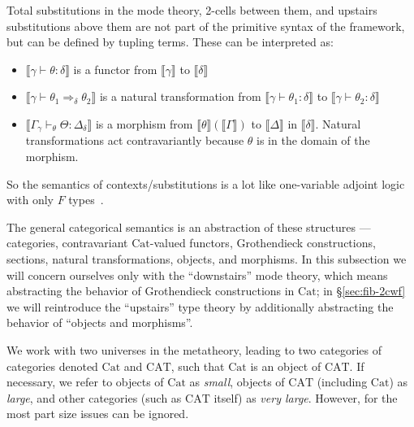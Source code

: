 \documentclass[10pt]{article}
\theoremstyle{definition}
\newcommand{\yields}{\vdash}
\newcommand{\tcell}{\Rightarrow}
\newcommand\mm[1]{\llbracket #1 \rrbracket}
\newcommand\Cat{\mathrm{Cat}}
\newcommand\CAT{\mathrm{CAT}}
\begin{document}
Total substitutions in the mode theory, 2-cells between them, and
upstairs substitutions above them are not part of the primitive syntax
of the framework, but can be defined by tupling terms.
These can be interpreted as: 
\begin{itemize}
\item $\mm{\gamma \yields \theta : \delta}$ is a functor from $\mm{\gamma}$ to $\mm{\delta}$
\item $\mm{\gamma \yields \theta_1 \tcell_\delta \theta_2}$ is a natural
  transformation from $\mm{\gamma \yields \theta_1 : \delta}$ to
  $\mm{\gamma \yields \theta_2 : \delta}$
\item $\mm{\Gamma_{\gamma} \yields_\theta \Theta : \Delta_\delta}$ is a
  morphism from $\mm{\theta}(\mm{\Gamma})$ to $\mm{\Delta}$ in
  $\mm{\delta}$.
  Natural transformations act contravariantly because $\theta$ is in the
  domain of the morphism.  
  \end{itemize}
So the semantics of contexts/substitutions is a lot like 
one-variable adjoint logic with only $F$ types~\cite{ls15adjoint}.  

The general categorical semantics is an abstraction of these structures --- categories, contravariant $\Cat$-valued functors, Grothendieck constructions, sections, natural transformations, objects, and morphisms.
In this subsection we will concern ourselves only with the ``downstairs'' mode theory, which means abstracting the behavior of Grothendieck constructions in $\Cat$; in \S\ref{sec:fib-2cwf} we will reintroduce the ``upstairs'' type theory by additionally abstracting the behavior of ``objects and morphisms''.

We work with two universes in the metatheory, leading to two categories of categories denoted $\Cat$ and $\CAT$, such that $\Cat$ is an object of $\CAT$.
If necessary, we refer to objects of $\Cat$ as \emph{small}, objects of $\CAT$ (including $\Cat$) as \emph{large}, and other categories (such as $\CAT$ itself) as \emph{very large}.
However, for the most part size issues can be ignored.
\end{document}
